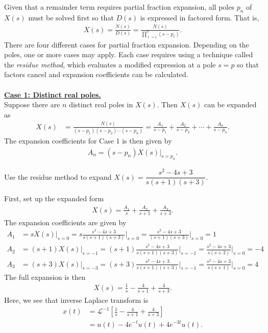 \documentclass{report}
\begin{document}
Given that a remainder term requires partial fraction expansion, all poles $p_n$ of $X(s)$ must be solved first so that $D(s)$ is expressed in factored form. That is, 
\begin{align}
    X(s) = \frac{N(s)}{D(s)} = \frac{N(s)}{\prod_{\ell=1}^{n}(s-p_{\ell})}.
\end{align}
\newpage
\noindent There are four different cases for partial fraction expansion. Depending on the poles, one or more cases may apply. Each case requires using a technique called the \emph{residue method}, which evaluates a modified expression 
at a pole $s=p$ so that factors cancel and expansion coefficients can be calculated. 
\\ \\
\textbf{\underline{Case 1: Distinct real poles.}} \\[0.25cm]
Suppose there are $n$ distinct real poles in $X(s)$. Then $X(s)$ can be expanded as 
\begin{align}
    X(s) &= \frac{N(s)}{(s-p_1)(s-p_2)\cdots(s-p_n)}=\frac{A_1}{s-p_1}+\frac{A_2}{s-p_2}+\cdots+\frac{A_n}{s-p_n}.
\end{align}
The expansion coefficients for Case 1 is then given by
\begin{align}
    A_n = (s-p_n)X(s)\big|_{s=p_n}.
\end{align}
\begin{example}
    Use the residue method to expand $X(s) = \dfrac{s^2-4s+3}{s(s+1)(s+3)}$. \\
\end{example}
\begin{solution}
    First, set up the expanded form 
    \begin{align*}
        X(s) = \frac{A_1}{s} + \frac{A_2}{s+1} + \frac{A_3}{s+3}.
    \end{align*}
    The expansion coefficients are given by 
    \begin{align*}
        A_1 &= sX(s)\big|_{s=0} = s\frac{s^2-4s+3}{s(s+1)(s+3)}\bigg|_{s=0} = \frac{s^2-4s+3}{(s+1)(s+3)}\bigg|_{s=0} = 1 \\[0.5cm]
        A_2 &= (s+1)X(s)\big|_{s=-1} = (s+1)\frac{s^2-4s+3}{s(s+1)(s+3)}\bigg|_{s=-1} = \frac{s^2-4s+3}{s(s+3)}\bigg|_{s=0} = -4 \\[0.5cm]
        A_3 &= (s+3)X(s)\big|_{s=-3} = (s+3)\frac{s^2-4s+3}{s(s+1)(s+3)}\bigg|_{s=-1} = \frac{s^2-4s+3}{s(s+1)}\bigg|_{s=0} = 4
    \end{align*}
    The full expansion is then 
    \begin{align*}
        X(s) = \frac{1}{s} - \frac{4}{s+1} + \frac{4}{s+3}.
    \end{align*}
    Here, we see that inverse Laplace transform is 
    \begin{align*}
        x(t) &= \mathcal{L}^{-1}\left[\frac{1}{s} - \frac{4}{s+1} + \frac{4}{s+3}\right] \\
        &= u(t) - 4e^{-t}u(t) + 4e^{-3t}u(t).
    \end{align*}
\end{solution}
\end{document}
